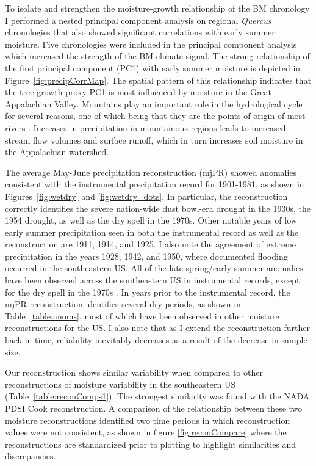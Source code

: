 To isolate and strengthen the moisture-growth relationship of the BM chronology  I  performed a nested principal component analysis on regional \textit{Quercus} chronologies that also showed significant correlations with early summer moisture. Five chronologies were included in the principal component analysis which increased the strength of the BM climate signal. The strong relationship of the first principal component (PC1) with early summer moisture is depicted in Figure~\ref{fig:precipCorrMap}. The spatial pattern of this relationship indicates that the tree-growth proxy PC1 is most influenced by moisture in the Great Appalachian Valley. Mountains play an important role in the hydrological cycle for several reasons, one of which being that they are the points of origin of most rivers \cite{beniston1997climatic}. Increases in precipitation in mountainous regions leads to increased stream flow volumes and surface runoff, which in turn increases soil moisture in the Appalachian watershed.

The average May-June precipitation reconstruction (mjPR) showed anomalies consistent with the instrumental precipitation record for 1901-1981, as shown in Figures~\ref{fig:wetdry} and \ref{fig:wetdry_dots}. In particular, the reconstruction correctly identifies the severe nation-wide dust bowl-era drought in the 1930s, the 1954 drought, as well as the dry spell in the 1970s. Other notable years of low early summer precipitation seen in both the instrumental record as well as the reconstruction are 1911, 1914, and 1925.  I  also note the agreement of extreme precipitation in the years 1928, 1942, and 1950, where documented flooding occurred in the southeastern US. All of the late-spring/early-summer anomalies have been observed across the southeastern US in instrumental records, except for the dry spell in the 1970s \cite{edwards1997characteristics}. In years prior to the instrumental record, the mjPR reconstruction identifies several dry periods, as shown in Table~\ref{table:anoms}, most of which have been observed in other moisture reconstructions for the US.  I  also note that as  I  extend the reconstruction further back in time, reliability inevitably decreases as a result of the decrease in sample size.

Our reconstruction shows similar variability when compared to other reconstructions of moisture variability in the southeastern US (Table~\ref{table:reconComps1}). The strongest similarity was found with the NADA PDSI Cook reconstruction. A comparison of the relationship between these two moisture reconstructions identified two time periods in which reconstruction values were not consistent, as shown in figure \ref{fig:reconCompare} where the reconstructions are standardized prior to plotting to highlight similarities and discrepancies. 

